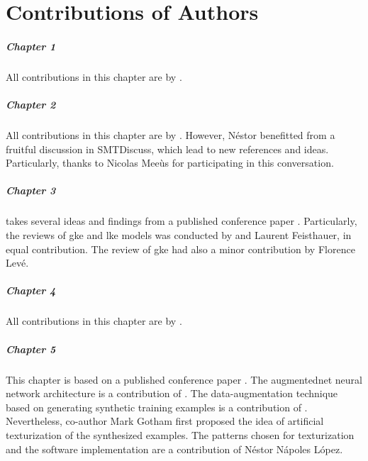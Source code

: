 \chapter*{Contributions of Authors}
\label{chap:contributionsofauthors}

\paragraph{Chapter 1}
All contributions in this chapter are by \myself{}.

\paragraph{Chapter 2}
All contributions in this chapter are by \myself{}. However,
N\'estor benefitted from a fruitful discussion in
SMTDiscuss,
which lead to new references and ideas. Particularly, thanks
to Nicolas Mee\`us for participating in this conversation.

\paragraph{Chapter 3} 
 takes several ideas and findings
from a published conference paper
\parencite{napoleslopez2020local}. Particularly, the reviews
of \gls{gke} and \gls{lke} models was conducted by \myself{}
and Laurent Feisthauer, in equal contribution. The review of
\gls{gke} had also a minor contribution by Florence Lev\'e.

\paragraph{Chapter 4} 
All contributions in this chapter are by \myself{}.

\paragraph{Chapter 5}
This chapter is based on a published conference paper
\parencite{napoleslopez2021augmentednet}. The
\gls{augmentednet} neural network architecture is a
contribution of \myself{}. The data-augmentation technique
based on generating synthetic training examples is a
contribution of \myself{}. Nevertheless, co-author Mark
Gotham first proposed the idea of artificial texturization
of the synthesized examples. The patterns chosen for
texturization and the software implementation are a
contribution of N\'estor N\'apoles L\'opez.

